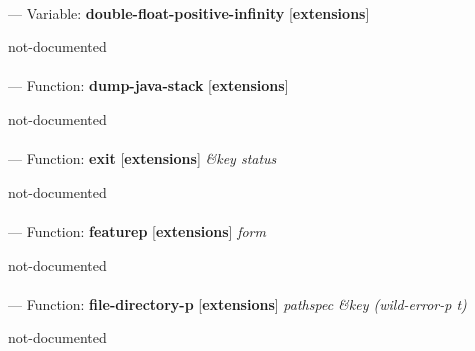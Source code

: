 \paragraph{}
\label{EXTENSIONS:DOUBLE-FLOAT-POSITIVE-INFINITY}
--- Variable: \textbf{double-float-positive-infinity} [\textbf{extensions}] \textit{}

\begin{adjustwidth}{5em}{5em}
not-documented
\end{adjustwidth}

\paragraph{}
\label{EXTENSIONS:DUMP-JAVA-STACK}
--- Function: \textbf{dump-java-stack} [\textbf{extensions}] \textit{}

\begin{adjustwidth}{5em}{5em}
not-documented
\end{adjustwidth}

\paragraph{}
\label{EXTENSIONS:EXIT}
--- Function: \textbf{exit} [\textbf{extensions}] \textit{\&key status}

\begin{adjustwidth}{5em}{5em}
not-documented
\end{adjustwidth}

\paragraph{}
\label{EXTENSIONS:FEATUREP}
--- Function: \textbf{featurep} [\textbf{extensions}] \textit{form}

\begin{adjustwidth}{5em}{5em}
not-documented
\end{adjustwidth}

\paragraph{}
\label{EXTENSIONS:FILE-DIRECTORY-P}
--- Function: \textbf{file-directory-p} [\textbf{extensions}] \textit{pathspec \&key (wild-error-p t)}

\begin{adjustwidth}{5em}{5em}
not-documented
\end{adjustwidth}

